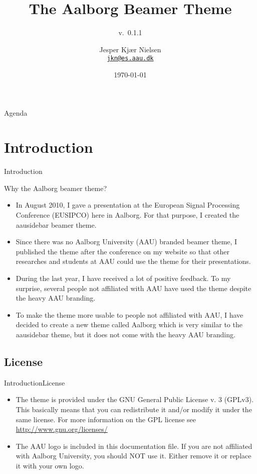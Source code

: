 \documentclass[10pt]{beamer}
\title[The Aalborg Beamer Theme]%
{The Aalborg Beamer Theme}
\subtitle[v.\ 0.1.1] %
{v.\ 0.1.1}
\author[Jesper Kjær Nielsen] %
{
  Jesper Kjær Nielsen\\
  \href{mailto:jkn@es.aau.dk}{{\tt jkn@es.aau.dk}}
}
\institute[
  Dept.\ of Computer Science,\\
  Aalborg University,\\
  Denmark
] %
{%
  Department of Electronic Systems,\\
  Aalborg University,\\
  Denmark
  
}
\date{\today}
\newcommand{\chref}[2]{%
  \href{#1}{{\usebeamercolor[bg]{Aalborg}#2}}
}
\begin{document}
\begin{frame}[plain] %
  \titlepage
\end{frame}

\begin{frame}{Agenda}{}
\tableofcontents
\end{frame}

\section{Introduction}
\begin{frame}{Introduction}{}
\begin{block}{Why the Aalborg beamer theme?}
  \begin{itemize}
    \item<1-> In August 2010, I gave a presentation at the European Signal Processing Conference (EUSIPCO) here in Aalborg. For that purpose, I created the aausidebar beamer theme.
    \item<2-> Since there was no Aalborg University (AAU) branded beamer theme, I published the theme after the conference on my website so that other researches and students at AAU could use the theme for their presentations.
    \item<3-> During the last year, I have received a lot of positive feedback. To my surprise, several people not affiliated with AAU have used the theme despite the heavy AAU branding.
    \item<4-> To make the theme more usable to people not affiliated with AAU, I have decided to create a new theme called Aalborg which is very similar to the aausidebar theme, but it does not come with the heavy AAU branding.
  \end{itemize}
\end{block}
\end{frame}

\subsection{License}
\begin{frame}{Introduction}{License}
  \begin{itemize}
    \item The theme is provided under the GNU General Public License v. 3 (GPLv3). This basically means that you can redistribute it and/or modify it under the same license. For more information on the GPL license see \chref{http://www.gnu.org/licenses/}{http://www.gnu.org/licenses/}
    \item The AAU logo is included in this documentation file. If you are not affiliated with Aalborg University, you should NOT use it. Either remove it or replace it with your own logo.
  \end{itemize}
\end{frame}
\end{document}
